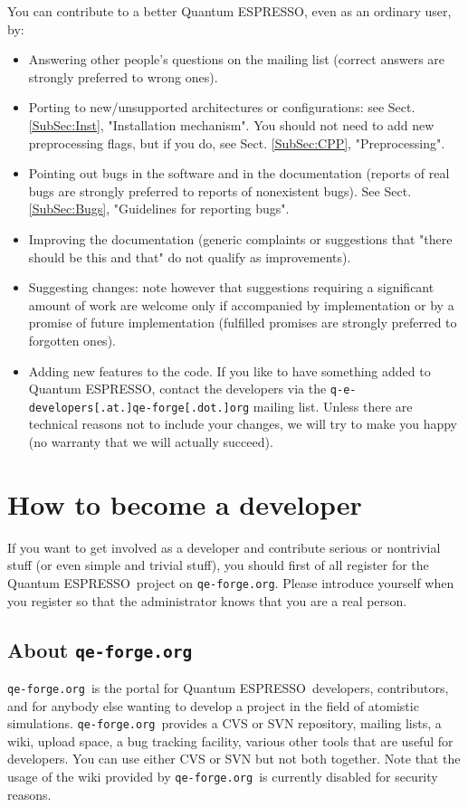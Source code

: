 \documentclass[12pt,a4paper]{article}
\def\qe{{\sc Quantum ESPRESSO}}
\def\qeforge{\texttt{qe-forge.org}}
\begin{document}
You can contribute to a better \qe, even as an ordinary user, by:
\begin{itemize}
\item Answering other people's questions on the mailing list (correct
  answers are strongly preferred to wrong ones). 
\item Porting to new/unsupported architectures or configurations: see
  Sect. \ref{SubSec:Inst}, "Installation mechanism". You should
  not need to add new preprocessing flags, but if you do, 
  see Sect. \ref{SubSec:CPP}, "Preprocessing".
\item Pointing out bugs in the software and in the documentation
  (reports of real bugs are strongly preferred to reports of
  nonexistent bugs). See Sect. \ref{SubSec:Bugs}, "Guidelines 
  for reporting bugs".
\item Improving the documentation (generic complaints or suggestions
  that "there should be this and that" do not qualify as improvements). 
\item Suggesting changes: note however that suggestions requiring a
  significant amount of work are welcome only if accompanied by
  implementation or by a promise of future implementation (fulfilled
  promises are strongly preferred to forgotten ones). 
\item Adding new features to the code. If you like to have something
  added to \qe, contact the developers via the
  \texttt{q-e-developers[.at.]qe-forge[.dot.]org} mailing list.
  Unless there are technical reasons not to include your changes, we 
  will try to make you happy (no warranty that we will actually succeed).
\end{itemize}

\section{How to become a developer}

If you want to get involved as a developer and contribute serious
or nontrivial stuff (or even simple and trivial stuff), you should
first of all register for the \qe\ project on \qeforge. Please 
introduce yourself when you register so that the administrator 
knows that you are a real person. 

\subsection{About \qeforge}

\qeforge\ is the portal for \qe\ developers, contributors,
and for anybody else wanting to develop a project in the
field of atomistic simulations.  \qeforge\ provides a CVS 
or SVN repository, mailing lists, a wiki, upload space, a
bug tracking facility, various other tools that are useful 
for developers. You can use either CVS or SVN but not both
together. Note that the usage of the wiki provided by \qeforge\ 
is currently disabled for security reasons.
\end{document}
